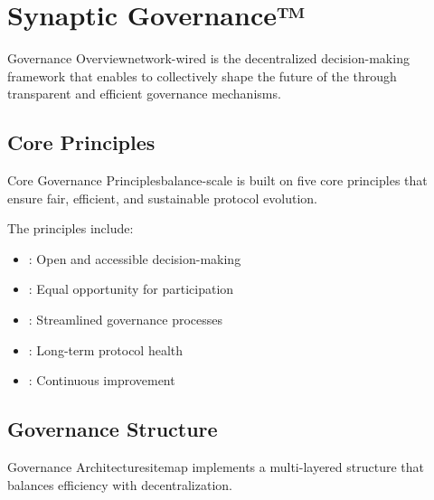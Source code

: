 
\section{Synaptic Governance™}

\begin{mfai-box}{Governance Overview}{network-wired}
 is the decentralized decision-making framework that enables  to collectively shape the future of the  through transparent and efficient governance mechanisms.
\end{mfai-box}

\subsection{Core Principles}

\begin{mfai-box-learn}{Core Governance Principles}{balance-scale}
 is built on five core principles that ensure fair, efficient, and sustainable protocol evolution.
\end{mfai-box-learn}

The principles include:

\begin{itemize}[leftmargin=*]
\item {}: Open and accessible decision-making
\item {}: Equal opportunity for participation
\item {}: Streamlined governance processes
\item {}: Long-term protocol health
\item {}: Continuous improvement
\end{itemize}

\subsection{Governance Structure}

\begin{mfai-box-build}{Governance Architecture}{sitemap}
 implements a multi-layered structure that balances efficiency with decentralization.
\end{mfai-box-build}

